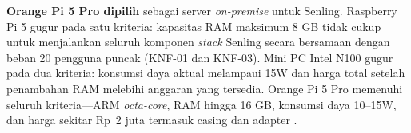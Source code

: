 \textbf{Orange Pi 5 Pro dipilih} sebagai server \textit{on-premise} untuk Senling. Raspberry Pi 5 gugur pada satu kriteria: kapasitas RAM maksimum 8 GB tidak cukup untuk menjalankan seluruh komponen \textit{stack} Senling secara bersamaan dengan beban 20 pengguna puncak (KNF-01 dan KNF-03). Mini PC Intel N100 gugur pada dua kriteria: konsumsi daya aktual melampaui 15W dan harga total setelah penambahan RAM melebihi anggaran yang tersedia. Orange Pi 5 Pro memenuhi seluruh kriteria—ARM \textit{octa-core}, RAM hingga 16 GB, konsumsi daya 10--15W, dan harga sekitar Rp~2 juta termasuk casing dan adapter \cite{orangepi2024pi5pro}.
